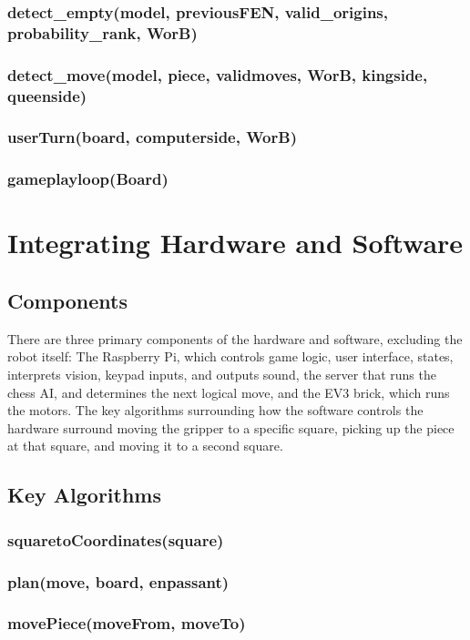 \documentclass[onecolumn]{IEEEtran}
\begin{document}
\subsubsection{detect\_empty(model, previousFEN, valid\_origins, probability\_rank, WorB)}
\subsubsection{detect\_move(model, piece, validmoves, WorB, kingside, queenside)}
\subsubsection{userTurn(board, computerside, WorB)}
\subsubsection{gameplayloop(Board)}
\section{Integrating Hardware and Software}
\subsection{Components}
There are three primary components of the hardware and software, excluding the robot itself: The Raspberry Pi, which controls game logic, user interface, states, interprets vision, keypad inputs, and outputs sound, the server that runs the chess AI, and determines the next logical move, and the EV3 brick, which runs the motors. The key algorithms surrounding how the software controls the hardware surround moving the gripper to a specific square, picking up the piece at that square, and moving it to a second square. 
\subsection{Key Algorithms}
\subsubsection{squaretoCoordinates(square)}
\subsubsection{plan(move, board, enpassant)}
\subsubsection{movePiece(moveFrom, moveTo)}
\end{document}
